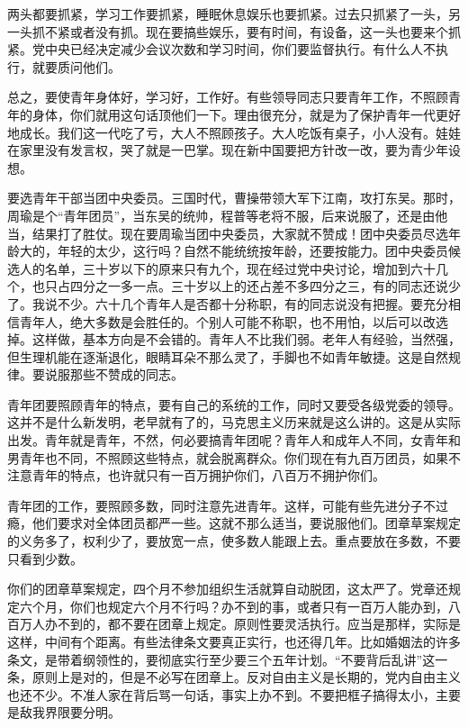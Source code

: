 两头都要抓紧，学习工作要抓紧，睡眠休息娱乐也要抓紧。过去只抓紧了一头，另一头抓不紧或者没有抓。现在要搞些娱乐，要有时间，有设备，这一头也要来个抓紧。党中央已经决定减少会议次数和学习时间，你们要监督执行。有什么人不执行，就要质问他们。

总之，要使青年身体好，学习好，工作好。有些领导同志只要青年工作，不照顾青年的身体，你们就用这句话顶他们一下。理由很充分，就是为了保护青年一代更好地成长。我们这一代吃了亏，大人不照顾孩子。大人吃饭有桌子，小人没有。娃娃在家里没有发言权，哭了就是一巴掌。现在新中国要把方针改一改，要为青少年设想。

要选青年干部当团中央委员。三国时代，曹操带领大军下江南，攻打东吴。那时，周瑜是个“青年团员”，当东吴的统帅，程普等老将不服，后来说服了，还是由他当，结果打了胜仗。现在要周瑜当团中央委员，大家就不赞成！团中央委员尽选年龄大的，年轻的太少，这行吗？自然不能统统按年龄，还要按能力。团中央委员候选人的名单，三十岁以下的原来只有九个，现在经过党中央讨论，增加到六十几个，也只占四分之一多一点。三十岁以上的还占差不多四分之三，有的同志还说少了。我说不少。六十几个青年人是否都十分称职，有的同志说没有把握。要充分相信青年人，绝大多数是会胜任的。个别人可能不称职，也不用怕，以后可以改选掉。这样做，基本方向是不会错的。青年人不比我们弱。老年人有经验，当然强，但生理机能在逐渐退化，眼睛耳朵不那么灵了，手脚也不如青年敏捷。这是自然规律。要说服那些不赞成的同志。

青年团要照顾青年的特点，要有自己的系统的工作，同时又要受各级党委的领导。这并不是什么新发明，老早就有了的，马克思主义历来就是这么讲的。这是从实际出发。青年就是青年，不然，何必要搞青年团呢？青年人和成年人不同，女青年和男青年也不同，不照顾这些特点，就会脱离群众。你们现在有九百万团员，如果不注意青年的特点，也许就只有一百万拥护你们，八百万不拥护你们。

青年团的工作，要照顾多数，同时注意先进青年。这样，可能有些先进分子不过瘾，他们要求对全体团员都严一些。这就不那么适当，要说服他们。团章草案规定的义务多了，权利少了，要放宽一点，使多数人能跟上去。重点要放在多数，不要只看到少数。

你们的团章草案规定，四个月不参加组织生活就算自动脱团，这太严了。党章还规定六个月，你们也规定六个月不行吗？办不到的事，或者只有一百万人能办到，八百万人办不到的，都不要在团章上规定。原则性要灵活执行。应当是那样，实际是这样，中间有个距离。有些法律条文要真正实行，也还得几年。比如婚姻法的许多条文，是带着纲领性的，要彻底实行至少要三个五年计划。“不要背后乱讲”这一条，原则上是对的，但是不必写在团章上。反对自由主义是长期的，党内自由主义也还不少。不准人家在背后骂一句话，事实上办不到。不要把框子搞得太小，主要是敌我界限要分明。


